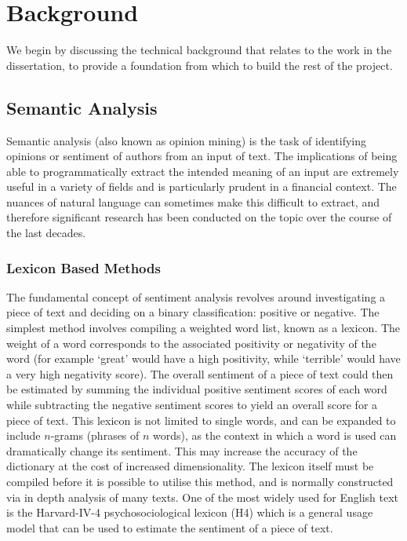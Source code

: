 \chapter{Background}
\label{chap:technical}

We begin by discussing the technical background that relates to the work in the dissertation, to provide a foundation from which to build the rest of the project.

\section{Semantic Analysis}
Semantic analysis (also known as opinion mining) is the task of identifying opinions or sentiment of authors from an input of text. The implications of being able to programmatically extract the intended meaning of an input are extremely useful in a variety of fields and is particularly prudent in a financial context. The nuances of natural language can sometimes make this difficult to extract, and therefore significant research has been conducted on the topic over the course of the last decades.

\subsection{Lexicon Based Methods}
The fundamental concept of sentiment analysis revolves around investigating a piece of text and deciding on a binary classification: positive or negative. The simplest method involves compiling a weighted word list, known as a lexicon. The weight of a word corresponds to the associated positivity or negativity of the word (for example `great' would have a high positivity, while `terrible' would have a very high negativity score). The overall sentiment of a piece of text could then be estimated by summing the individual positive sentiment scores of each word while subtracting the negative sentiment scores to yield an overall score for a piece of text. This lexicon is not limited to single words, and can be expanded to include $n$-grams (phrases of $n$ words), as the context in which a word is used can dramatically change its sentiment. This may increase the accuracy of the dictionary at the cost of increased dimensionality. The lexicon itself must be compiled before it is possible to utilise this method, and is normally constructed via in depth analysis of many texts. One of the most widely used for English text is the Harvard-IV-4 psychosociological lexicon (H4) which is a general usage model that can be used to estimate the sentiment of a piece of text.

